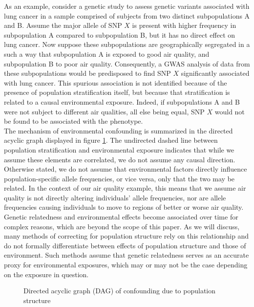 As an example, consider a genetic study to assess genetic variants associated with lung cancer in a sample comprised of subjects from two distinct subpopulations A and B. Assume the major allele of SNP $X$ is present with higher frequency in subpopulation A compared to subpopulation B, but it has no direct effect on lung cancer. Now suppose these subpopulations are geographically segregated in a such a way that subpopulation A is exposed to good air quality, and subpopulation B to poor air quality. Consequently, a GWAS analysis of data from these subpopulations would be predisposed to find SNP $X$ significantly associated with lung cancer. This spurious association is not identified because of the presence of population stratification itself, but because that stratification is related to a causal environmental exposure. Indeed, if subpopulations A and B were not subject to different air qualities, all else being equal, SNP $X$ would not be found to be associated with the phenotype.\\


The mechanism of environmental confounding is summarized in the directed acyclic graph displayed in figure \ref{fig:ps_env}. The undirected dashed line between population stratification and environmental exposure indicates that while we assume these elements are correlated, we do not assume any causal direction. Otherwise stated, we do not assume that environmental factors directly influence population-specific allele frequencies, or vice versa, only that the two may be related. In the context of our air quality example, this means that we assume air quality is not directly altering individuals' allele frequencies, nor are allele frequencies causing individuals to move to regions of better or worse air quality. Genetic relatedness and environmental effects become associated over time for complex reasons, which are beyond the scope of this paper. As we will discuss, many methods of correcting for population structure rely on this relationship and do not formally differentiate between effects of population structure and those of environment. Such methods assume that genetic relatedness serves as an accurate proxy for environmental exposures, which may or may not be the case depending on the exposure in question.

\begin{figure}[H]
\centering
{}
\caption{Directed acyclic graph (DAG) of confounding due to population structure}
\label{fig:ps_env}
\end{figure}

